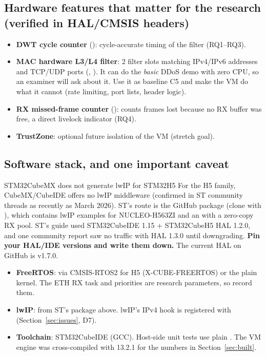 \documentclass[10pt,a4paper]{article}
\begin{document}
\subsection{Hardware features that matter for the research (verified in HAL/CMSIS headers)}
\begin{itemize}
  \item \textbf{DWT cycle counter} (): cycle-accurate timing of the filter (RQ1--RQ3).
  \item \textbf{MAC hardware L3/L4 filter}: 2 filter slots matching IPv4/IPv6 addresses and TCP/UDP ports (, ). It can do the \emph{basic} DDoS demo with zero CPU, so an examiner will ask about it. Use it as baseline C5 and make the VM do what it cannot (rate limiting, port lists, header logic).
  \item \textbf{RX missed-frame counter} (): counts frames lost because no RX buffer was free, a direct livelock indicator (RQ4).
  \item \textbf{TrustZone}: optional future isolation of the VM (stretch goal).
\end{itemize}

\subsection{Software stack, and one important caveat}
\begin{warnbox}{STM32CubeMX does not generate lwIP for STM32H5}
For the H5 family, CubeMX/CubeIDE offers no lwIP middleware (confirmed in ST community threads as recently as March 2026). ST's route is the GitHub package  (clone with ), which contains lwIP examples for NUCLEO-H563ZI and an  with a zero-copy RX pool. ST's guide used STM32CubeIDE 1.15 + STM32CubeH5 HAL 1.2.0, and one community report saw no traffic with HAL 1.3.0 until downgrading. \textbf{Pin your HAL/IDE versions and write them down.} The current HAL on GitHub is v1.7.0.
\end{warnbox}
\begin{itemize}
  \item \textbf{FreeRTOS}: via CMSIS-RTOS2 for H5 (X-CUBE-FREERTOS) or the plain kernel. The ETH RX task and  priorities are research parameters, so record them.
  \item \textbf{lwIP}: from ST's package above. lwIP's IPv4 hook is registered with  (Section~\ref{sec:issues}, D7).
  \item \textbf{Toolchain}: STM32CubeIDE (GCC). Host-side unit tests use plain . The VM engine was cross-compiled with  13.2.1 for the numbers in Section~\ref{sec:built}.
\end{itemize}
\end{document}
